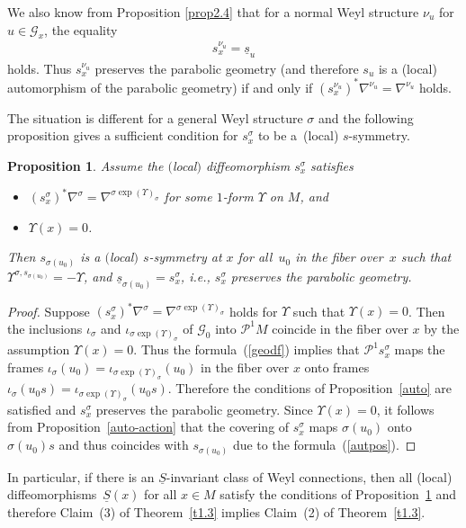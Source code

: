 \documentclass[pdftex]{sigma}
\newcommand{\si}{\sigma}
\newcommand{\un}{\underline}
\newcommand{\ba}{\mathcal{G}}
\newcommand{\U}{\Upsilon}
\numberwithin{equation}{section}
\newtheorem{Proposition}[Theorem]{Proposition}
 { \theoremstyle{definition}
\newtheorem{Definition}[Theorem]{Definition}
\newtheorem{Example}[Theorem]{Example}
\newtheorem{Remark}[Theorem]{Remark} }
\begin{document}
We also know from Proposition \ref{prop2.4} that for a normal Weyl structure $\nu_u$ for $u\in\ba_x$, the equality
\begin{gather*}s^{\nu_u}_x=\un s_u\end{gather*}
holds. Thus $s^{\nu_u}_x$ preserves the parabolic geometry (and therefore $s_u$ is a (local) automorphism of the parabolic geometry) if and only if $(s^{\nu_u}_x)^*\nabla^{\nu_u}=\nabla^{\nu_{u}}$ holds.

The situation is dif\/ferent for a general Weyl structure $\si$ and the following proposition gives a suf\/f\/icient condition for $s^\si_x$ to be a~(local) $s$-symmetry.

\begin{Proposition} \label{geodesic-s-symm}
Assume the $($local$)$ diffeomorphism $s^{\si}_x$ satisfies
\begin{itemize}\itemsep=0pt
\item $(s^{\si}_x)^*\nabla^\si=\nabla^{\si\exp (\U)_\si}$ for some $1$-form $\U$ on $M$,
and
\item $\U(x)=0$.
\end{itemize}
Then $s_{\si(u_0)}$ is a $($local$)$ $s$-symmetry at $x$ for all~$u_0$ in the fiber over~$x$ such that $\U^{\si,s_{\si(u_0)}}=-\U$, and $\un s_{\si(u_0)}=s^{\si}_x$, i.e., $s^{\si}_x$
preserves the parabolic geometry.
\end{Proposition}
\begin{proof}
Suppose $(s^{\si}_x)^*\nabla^\si=\nabla^{\si\exp(\U)_\si}$ holds for $\U$ such that $\U(x)=0$. Then the inclusions $\iota_{\si}$ and $\iota_{\si\exp(\U)_\si}$ of $\ba_0$ into $\mathcal{P}^1M$ coincide in the f\/iber over $x$ by the assumption $\U(x)=0$. Thus the formula~(\ref{geodf}) implies that $\mathcal{P}^1s^{\si}_x$ maps the frames $\iota_{\si}(u_0)=\iota_{\si\exp (\U)_\si}(u_0)$ in the f\/iber over $x$ onto frames $\iota_{\si}(u_0s)=\iota_{\si\exp(\U)_\si}(u_0s)$. Therefore the conditions of Proposition~\ref{auto} are satisf\/ied and $s^{\si}_x$ preserves the parabolic geometry. Since $\U(x)=0$, it follows from Proposition~\ref{auto-action} that the covering of $s^{\si}_x$ maps $\si(u_0)$ onto $\si(u_0)s$ and thus coincides with $s_{\si(u_0)}$ due to the for\-mu\-la~(\ref{autpos}).
\end{proof}

In particular, if there is an $\un S$-invariant class of Weyl connections, then all (local) dif\/feo\-mor\-phisms~$\un S(x)$ for all $x\in M$ satisfy the conditions of Proposition~\ref{geodesic-s-symm} and therefore Claim~(3) of Theorem~\ref{t1.3} implies Claim~(2) of Theorem~\ref{t1.3}.
\end{document}
